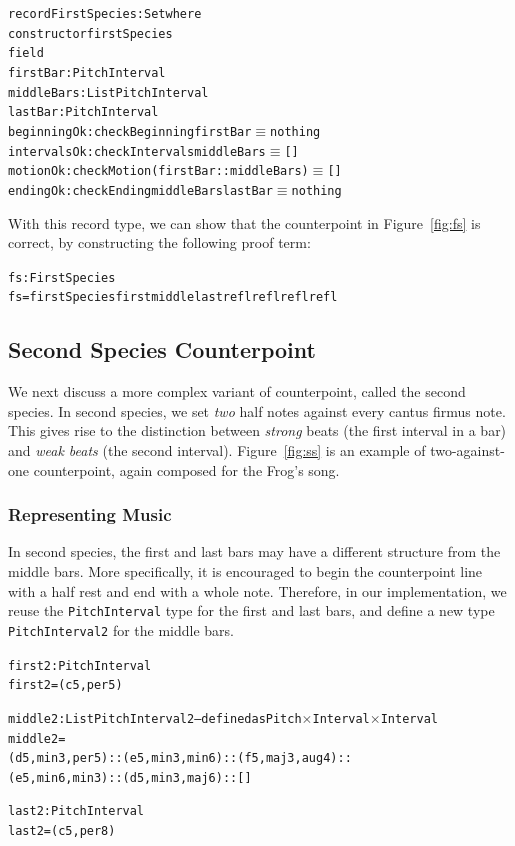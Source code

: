 \begin{alltt}
record FirstSpecies : Set where
  constructor firstSpecies
  field
    firstBar    : PitchInterval
    middleBars  : List PitchInterval
    lastBar     : PitchInterval
    beginningOk : checkBeginning firstBar \(\equiv\) nothing
    intervalsOk : checkIntervals middleBars \(\equiv\) []
    motionOk    : checkMotion (firstBar :: middleBars) \(\equiv\) []
    endingOk    : checkEnding middleBars lastBar \(\equiv\) nothing
\end{alltt}

With this record type, we can show that the counterpoint in
Figure~\ref{fig:fs} is correct, by constructing the following proof term:

\begin{alltt}
fs : FirstSpecies
fs = firstSpecies first middle last refl refl refl refl
\end{alltt}

\subsection{Second Species Counterpoint}
\label{sec:cp:ss}

\SS

We next discuss a more complex variant of counterpoint, called the
second species.
In second species, we set \emph{two} half notes against every cantus
firmus note.
This gives rise to the distinction between \emph{strong} beats (the
first interval in a bar) and \emph{weak beats} (the second interval).
Figure~\ref{fig:ss} is an example of two-against-one counterpoint,
again composed for the Frog's song.

\subsubsection{Representing Music}

In second species, the first and last bars may have a different structure
from the middle bars.
More specifically, it is encouraged to begin the counterpoint line with
a half rest and end with a whole note.
Therefore, in our implementation, we reuse the \texttt{PitchInterval} 
type for the first and last bars, and define a new type
\texttt{PitchInterval2} for the middle bars.

\begin{alltt}
first2 : PitchInterval
first2 = (c 5 , per5)

middle2 : List PitchInterval2 -- defined as Pitch \(\times\) Interval \(\times\) Interval
middle2 =
  (d 5 , min3 , per5) :: (e 5 , min3 , min6) :: (f 5 , maj3 , aug4) ::
  (e 5 , min6 , min3) :: (d 5 , min3 , maj6) :: []

last2 : PitchInterval
last2 = (c 5 , per8)
\end{alltt}

